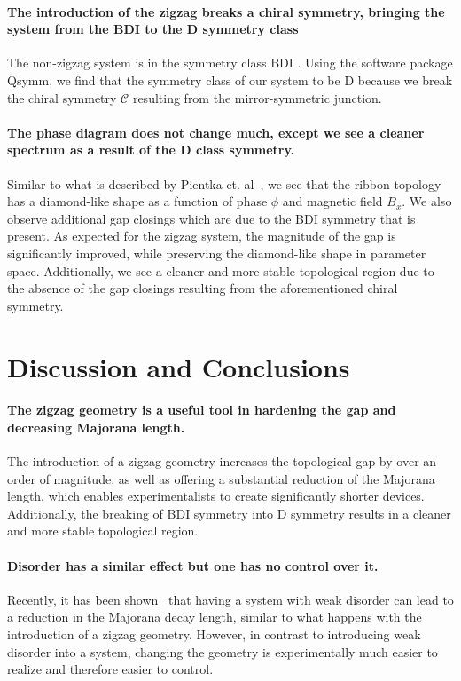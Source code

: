 \documentclass[english, twocolumn, 10pt, aps, superscriptaddress, floatfix, prb, citeautoscript]{revtex4-1}
\renewcommand{\comment}[2]{#2}
\renewcommand{\comment}{\paragraph}
\begin{document}
\comment{The introduction of the zigzag breaks a chiral symmetry, bringing the system from the BDI to the D symmetry class}
The non-zigzag system is in the symmetry class BDI \cite{pientka2017topological}.
Using the software package Qsymm\cite{varjas2018qsymm}, we find that the symmetry class of our system to be D because we break the chiral symmetry $\mathcal{C}$ resulting from the mirror-symmetric junction.

\comment{The phase diagram does not change much, except we see a cleaner spectrum as a result of the D class symmetry.}
Similar to what is described by Pientka et. al~\cite{pientka2017topological}, we see that the ribbon topology has a diamond-like shape as a function of phase $\phi$ and magnetic field $B_x$.
We also observe additional gap closings which are due to the BDI symmetry that is present.
As expected for the zigzag system, the magnitude of the gap is significantly improved, while preserving the diamond-like shape in parameter space.
Additionally, we see a cleaner and more stable topological region due to the absence of the gap closings resulting from the aforementioned chiral symmetry.

\section{Discussion and Conclusions}

\comment{The zigzag geometry is a useful tool in hardening the gap and decreasing Majorana length.}
The introduction of a zigzag geometry increases the topological gap by over an order of magnitude, as well as offering a substantial reduction of the Majorana length, which enables experimentalists to create significantly shorter devices.
Additionally, the breaking of BDI symmetry into D symmetry results in a cleaner and more stable topological region.

\comment{Disorder has a similar effect but one has no control over it.}
Recently, it has been shown~\cite{haim_double-edge_2018} that having a system with weak disorder can lead to a reduction in the Majorana decay length, similar to what happens with the introduction of a zigzag geometry.
However, in contrast to introducing weak disorder into a system, changing the geometry is experimentally much easier to realize and therefore easier to control.
\end{document}
